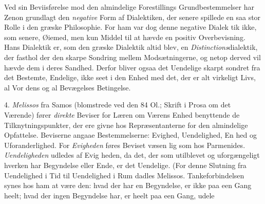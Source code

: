 \documentclass[12pt,a4paper]{book}
\begin{document}
Ved sin Beviisførelse mod den almindelige Forestillings
Grundbestemmelser har Zenon grundlagt den \emph{negative} Form
af Dialektiken, der senere spillede en saa stor Rolle i den
græske Philosophie. For ham var dog denne negative Dialek\-%
tik ikke, som senere, Øiemed, men kun Middel til at hævde
en positiv Overbevisning. Hans Dialektik er, som den græske
Dialektik altid blev, en \emph{Distinctions}dialektik, der fasthol\-%
der den skarpe Sondring mellem Modsætningerne, og netop
derved vil hævde dem i deres Sandhed. Derfor bliver ogsaa
det Uendelige skarpt sondret fra det Bestemte, Endelige, ikke
seet i den Enhed med det, der er alt virkeligt Livs, al Vor\-%
dens og al Bevægelses Betingelse.

4. \emph{Melissos} fra Samos (blomstrede ved den 84 Ol.;
Skrift i Prosa om det Værende) fører \emph{direkte} Beviser for
Læren om Værens Enhed benyttende de Tilknytningspunkter, der
ere givne hos Repræsentanterne for den almindelige Opfattelse.
Beviserne angaae Bestemmelserne: Evighed, Uendelighed, En\-%
hed og Uforanderlighed. For \emph{Evigheden} føres Beviset væsen\-%
lig som hos Parmenides. \emph{Uendeligheden} udledes af Evig\-%
heden, da det, der som utilblevet og uforgængeligt hverken
har Begyndelse eller Ende, er det Uendelige. (For denne
Slutning fra Uendelighed i Tid til Uendelighed i Rum dadles
Melissos. Tankeforbindelsen synes hos ham at være den:
hvad der har en Begyndelse, er ikke paa een Gang heelt;
hvad der ingen Begyndelse har, er heelt paa een Gang, udele\-%
%
%
\end{document}
